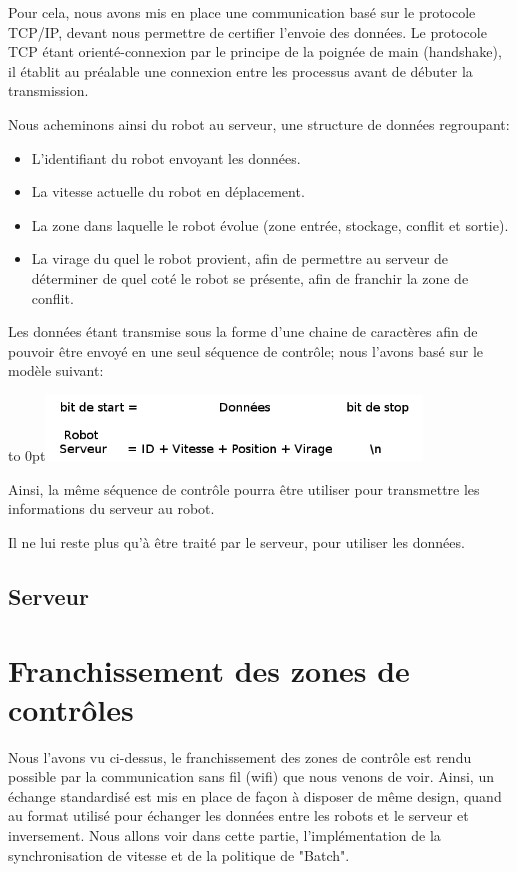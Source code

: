 \documentclass[french,a4paper,12pt]{report}
\begin{document}
Pour cela, nous avons mis en place une communication basé sur le protocole TCP/IP, devant nous permettre de certifier l'envoie des données. Le protocole TCP étant orienté-connexion par le principe de la poignée de main (handshake), il établit au préalable une connexion entre les processus avant de débuter la transmission.

Nous acheminons ainsi du robot au serveur, une structure de données regroupant:
  \begin{itemize}
  \item L'identifiant du robot envoyant les données.
  \item La vitesse actuelle du robot en déplacement.
  \item La zone dans laquelle le robot évolue (zone entrée, stockage, conflit et sortie).
  \item La virage du quel le robot provient, afin de permettre au serveur de déterminer de quel coté le robot se présente, afin de franchir la zone de conflit.
  \end{itemize}
  
Les données étant transmise sous la forme d'une chaine de caractères afin de pouvoir être envoyé en une seul  séquence de contrôle; nous l'avons basé sur le modèle suivant:

\hfill\hbox to 0pt{\hss\includegraphics[width=10cm]{sequ.png}\hss}\hfill\null\newline

Ainsi, la même séquence de contrôle pourra être utiliser pour transmettre les informations du serveur au robot.

Il ne lui reste plus qu'à être traité par le serveur, pour utiliser les données.

\section{Serveur}%

\chapter{Franchissement des zones de contrôles}
Nous l'avons vu ci-dessus, le franchissement des zones de contrôle est rendu possible par la communication sans fil (wifi) que nous venons de voir. Ainsi, un échange standardisé est mis en place de façon à disposer de même design, quand au format utilisé pour échanger les données entre les robots et le serveur et inversement.
Nous allons voir dans cette partie, l'implémentation de la synchronisation de vitesse et de la politique de "Batch".
\end{document}

